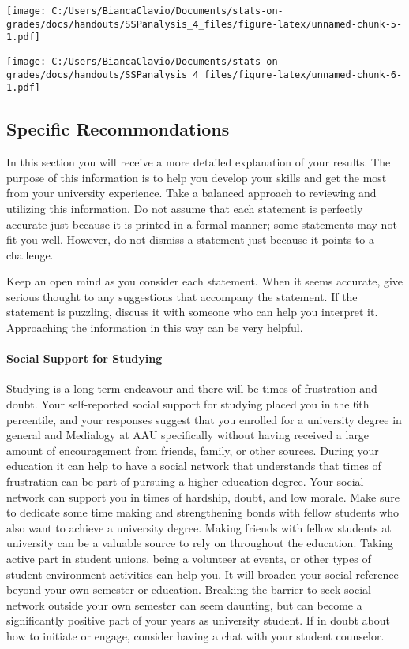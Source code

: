 \documentclass[]{article}
\let\oldparagraph\paragraph
\renewcommand{\paragraph}[1]{\oldparagraph{#1}\mbox{}}
\begin{document}
\texttt{[image: C:/Users/BiancaClavio/Documents/stats-on-grades/docs/handouts/SSPanalysis\_4\_files/figure-latex/unnamed-chunk-5-1.pdf]}

\texttt{[image: C:/Users/BiancaClavio/Documents/stats-on-grades/docs/handouts/SSPanalysis\_4\_files/figure-latex/unnamed-chunk-6-1.pdf]}

\pagebreak

\subsection{Specific Recommondations}\label{specific-recommondations}

In this section you will receive a more detailed explanation of your
results. The purpose of this information is to help you develop your
skills and get the most from your university experience. Take a balanced
approach to reviewing and utilizing this information. Do not assume that
each statement is perfectly accurate just because it is printed in a
formal manner; some statements may not fit you well. However, do not
dismiss a statement just because it points to a challenge.

Keep an open mind as you consider each statement. When it seems
accurate, give serious thought to any suggestions that accompany the
statement. If the statement is puzzling, discuss it with someone who can
help you interpret it. Approaching the information in this way can be
very helpful.

\paragraph{Social Support for
Studying}\label{social-support-for-studying}

Studying is a long-term endeavour and there will be times of frustration
and doubt. Your self-reported social support for studying placed you in
the 6th percentile, and your responses suggest that you enrolled for a
university degree in general and Medialogy at AAU specifically without
having received a large amount of encouragement from friends, family, or
other sources. During your education it can help to have a social
network that understands that times of frustration can be part of
pursuing a higher education degree. Your social network can support you
in times of hardship, doubt, and low morale. Make sure to dedicate some
time making and strengthening bonds with fellow students who also want
to achieve a university degree. Making friends with fellow students at
university can be a valuable source to rely on throughout the education.
Taking active part in student unions, being a volunteer at events, or
other types of student environment activities can help you. It will
broaden your social reference beyond your own semester or education.
Breaking the barrier to seek social network outside your own semester
can seem daunting, but can become a significantly positive part of your
years as university student. If in doubt about how to initiate or
engage, consider having a chat with your student counselor.
\end{document}
